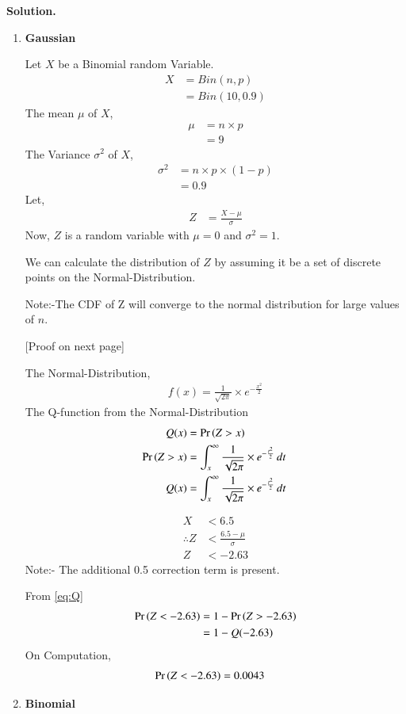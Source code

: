 \documentclass[journal,12pt,twocolumn]{IEEEtran}
\begin{document}
\textbf{Solution.}
\begin{enumerate}
    \item 
    \textbf{Gaussian}
    
Let $X$ be a Binomial random Variable.
\begin{align}
    X&=Bin(n,p)\\
    &=Bin(10,0.9)
\end{align}
The mean $\mu$ of $X$,
\begin{align}
    \mu &= n\times p\\
    &= 9
\end{align}
The Variance $\sigma^2$ of $X$,
\begin{align}
    \sigma^2 &= n\times p\times (1-p)\\
    &= 0.9
\end{align}
Let,
\begin{align}
    Z&=\frac{X-\mu}{\sigma}
\end{align}
Now, $Z$ is a random variable with $\mu=0$ and $\sigma^2=1$.

We can calculate the distribution of $Z$ by assuming it be a set of discrete points on the Normal-Distribution.

Note:-The CDF of Z will converge to the normal distribution for large values of $n$.

[Proof on next page]

The Normal-Distribution,
\begin{align}
    f(x) = \frac{1}{\sqrt{2\pi}}\times e^{-\frac{x^2}{2}}
\end{align}
The Q-function from the Normal-Distribution
\begin{align}
    Q(x) &=\Pr\left(Z>x\right)\\
    \Pr\left(Z>x\right)&=\int_{x}^{\infty} \frac{1}{\sqrt{2\pi}}\times e^{-\frac{t^2}{2}} \,dt\\\
    \label{eq:Q}
    Q(x)&=\int_{x}^{\infty} \frac{1}{\sqrt{2\pi}}\times e^{-\frac{t^2}{2}} \,dt\
\end{align}

\begin{align}
    X &< 6.5\\
    \therefore Z &< \frac{6.5-\mu}{\sigma}\\
    Z&<-2.63
\end{align}
Note:- The additional 0.5 correction term is present.

From \eqref{eq:Q}
\begin{align}
\Pr\left(Z<-2.63\right) &= 1-\Pr\left(Z>-2.63\right)\\
    &= 1- Q(-2.63)
\end{align}
On Computation,
\begin{align}
\Pr\left(Z<-2.63\right) &= 0.0043
\end{align}
\item 
\textbf{Binomial}


\end{enumerate}
\end{document}
